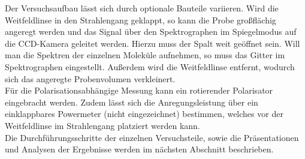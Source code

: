 Der Versuchsaufbau lässt sich durch optionale Bauteile variieren. 
Wird die Weitfeldlinse in den Strahlengang geklappt, so kann die Probe großflächig angeregt werden und das 
Signal über den Spektrographen im Spiegelmodus auf die CCD-Kamera geleitet werden. Hierzu muss der 
Spalt weit geöffnet sein. Will man die Spektren der einzelnen Moleküle aufnehmen, so muss das Gitter 
im Spektrographen eingestellt. Außerdem wird die Weitfeldlinse entfernt, wodurch 
sich das angeregte Probenvolumen verkleinert. \\ 
Für die Polarisationsabhängige Messung kann ein rotierender Polarisator eingebracht werden. Zudem lässt sich 
die Anregungsleistung über ein einklappbares Powermeter (nicht eingezeichnet) bestimmen, welches 
vor der Weitfeldlinse im Strahlengang platziert werden kann. \\
Die Durchführungsschritte der einzelnen Versuchsteile, sowie die Präsentationen und Analysen der 
Ergebnisse werden im nächsten Abschnitt beschrieben. \\



